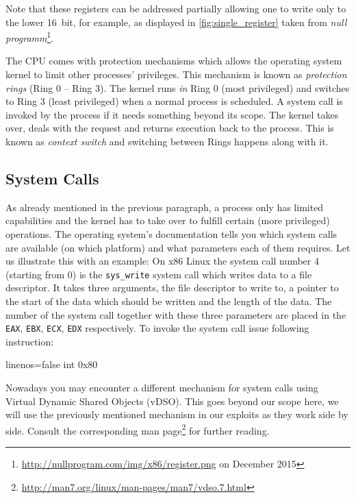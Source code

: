 \documentclass[article]{uibk}
\begin{document}
Note that these registers can be addressed partially allowing one to write only
to the lower \SI{16}{bit}, for example, as displayed in
\cref{fig:single_register} taken from \textit{null
programm}\footnote{\url{http://nullprogram.com/img/x86/register.png} on
December 2015}.

The CPU comes with protection mechanisms which allows the operating system
kernel to limit other processes' privileges. This mechanism is known as
\textit{protection rings} (Ring 0 -- Ring 3). The kernel runs \emph{in} Ring 0
(most privileged) and switches to Ring 3 (least privileged) when a normal
process is scheduled. A system call is invoked by the process if it needs
something beyond its scope. The kernel takes over, deals with the request and
returns execution back to the process. This is known as \textit{context switch}
and switching between Rings happens along with it.

\subsection{System Calls}

As already mentioned in the previous paragraph, a process only has limited
capabilities and the kernel has to take over to fulfill certain (more
privileged) operations. The operating system's documentation tells you which
system calls are available (on which platform) and what parameters
each of them requires. Let us illustrate this with an example: On x86 Linux the
system call
number 4 (starting from 0) is the \texttt{sys\_write} system call which writes
data to a file descriptor. It takes three arguments, the file descriptor to
write to, a pointer to the start of the data which should be written and the
length of the data. The number of the system call together with these three
parameters are placed in the \texttt{EAX}, \texttt{EBX}, \texttt{ECX},
\texttt{EDX} respectively. To invoke the system call issue following
instruction:

\begin{nasmcode*}{linenos=false}
    int     0x80
\end{nasmcode*}

Nowadays you may encounter a different mechanism for system calls using Virtual
Dynamic Shared Objects (vDSO). This goes beyond our scope here, we will use the
previously mentioned mechanism in our exploits as they work side by side.
Consult the corresponding man
page\footnote{\url{http://man7.org/linux/man-pages/man7/vdso.7.html}} for
further reading.
\end{document}
